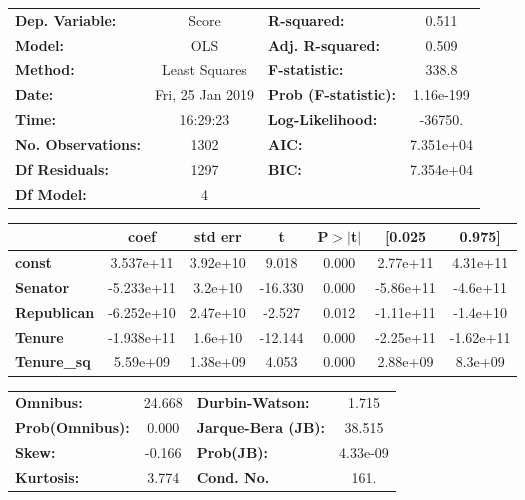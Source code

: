 \begin{center}
\begin{tabular}{lclc}
\toprule
\textbf{Dep. Variable:}    &      Score       & \textbf{  R-squared:         } &     0.511   \\
\textbf{Model:}            &       OLS        & \textbf{  Adj. R-squared:    } &     0.509   \\
\textbf{Method:}           &  Least Squares   & \textbf{  F-statistic:       } &     338.8   \\
\textbf{Date:}             & Fri, 25 Jan 2019 & \textbf{  Prob (F-statistic):} & 1.16e-199   \\
\textbf{Time:}             &     16:29:23     & \textbf{  Log-Likelihood:    } &   -36750.   \\
\textbf{No. Observations:} &        1302      & \textbf{  AIC:               } & 7.351e+04   \\
\textbf{Df Residuals:}     &        1297      & \textbf{  BIC:               } & 7.354e+04   \\
\textbf{Df Model:}         &           4      & \textbf{                     } &             \\
\bottomrule
\end{tabular}
\begin{tabular}{lcccccc}
                    & \textbf{coef} & \textbf{std err} & \textbf{t} & \textbf{P$>$$|$t$|$} & \textbf{[0.025} & \textbf{0.975]}  \\
\midrule
\textbf{const}      &    3.537e+11  &     3.92e+10     &     9.018  &         0.000        &     2.77e+11    &     4.31e+11     \\
\textbf{Senator}    &   -5.233e+11  &      3.2e+10     &   -16.330  &         0.000        &    -5.86e+11    &     -4.6e+11     \\
\textbf{Republican} &   -6.252e+10  &     2.47e+10     &    -2.527  &         0.012        &    -1.11e+11    &     -1.4e+10     \\
\textbf{Tenure}     &   -1.938e+11  &      1.6e+10     &   -12.144  &         0.000        &    -2.25e+11    &    -1.62e+11     \\
\textbf{Tenure\_sq} &     5.59e+09  &     1.38e+09     &     4.053  &         0.000        &     2.88e+09    &      8.3e+09     \\
\bottomrule
\end{tabular}
\begin{tabular}{lclc}
\textbf{Omnibus:}       & 24.668 & \textbf{  Durbin-Watson:     } &    1.715  \\
\textbf{Prob(Omnibus):} &  0.000 & \textbf{  Jarque-Bera (JB):  } &   38.515  \\
\textbf{Skew:}          & -0.166 & \textbf{  Prob(JB):          } & 4.33e-09  \\
\textbf{Kurtosis:}      &  3.774 & \textbf{  Cond. No.          } &     161.  \\
\bottomrule
\end{tabular}
\end{center}